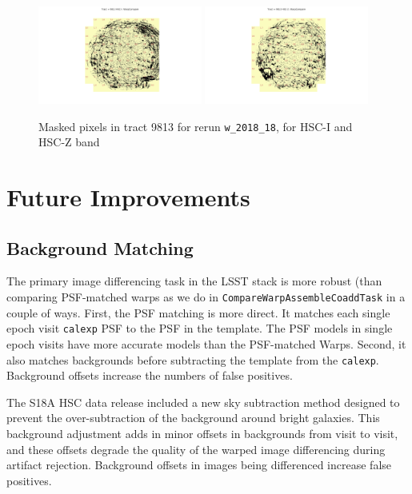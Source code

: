 \documentclass[DM,authoryear,toc]{lsstdoc}
\begin{document}
\begin{figure}
\begin{centering}
\includegraphics[width=0.48\textwidth]{figures/mask_DM-13637_9813HSC-I.png}
\includegraphics[width=0.48\textwidth]{figures/mask_DM-13637_9813HSC-Z.png}
\par\end{centering}
\caption{\label{fig:9813Maps} Masked pixels in tract 9813 for rerun \texttt{w\_2018\_18},  for HSC-I and HSC-Z band}
\end{figure}

\section{Future Improvements}

\subsection{Background Matching}
\label{sec:background_matching}

The primary image differencing task in the LSST stack is more robust (than comparing PSF-matched warps as we do in \texttt{CompareWarpAssembleCoaddTask} in a couple of ways.
First, the PSF matching is more direct.
It matches each single epoch visit \texttt{calexp} PSF to the PSF in the template.
The PSF models in single epoch visits have more accurate models than the PSF-matched Warps.
Second, it also matches backgrounds before subtracting the template from the \texttt{calexp}.
Background offsets increase the numbers of false positives.

The S18A  HSC data release included a new sky subtraction method designed to prevent the over-subtraction of the background around bright galaxies.
This background adjustment adds in minor offsets in backgrounds from visit to visit, and these offsets degrade the quality of the warped image differencing during artifact rejection.
Background offsets in images being differenced increase false positives.
\end{document}
